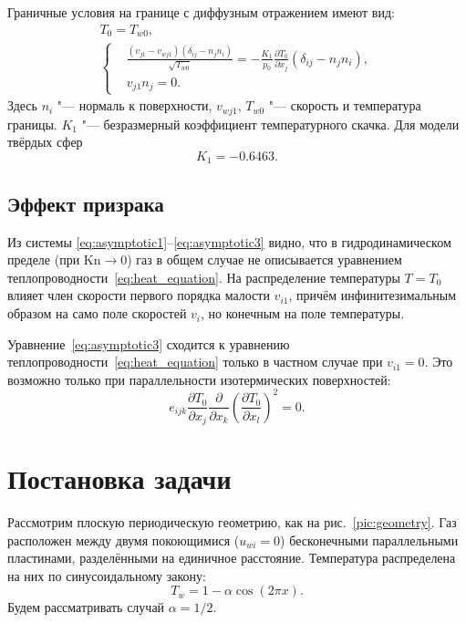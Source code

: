 \documentclass[english,russian,a4paper,12pt]{article}
\newcommand{\Kn}{\mathrm{Kn}}
\newcommand{\pder}[2][]{\frac{\partial#1}{\partial#2}}
\begin{document}
Граничные условия на границе с диффузным отражением имеют вид:
\begin{gather}
	T_0 = T_{w0}, \label{eq:bound:T} \\
	\left\{
	\begin{aligned}
		& \frac{(v_{j1}-v_{wj1})(\delta_{ij}-n_jn_i)}{\sqrt{T_{w0}}} = 
			-\frac{K_1}{p_0}\pder[T_0]{x_j}(\delta_{ij}-n_jn_i), \\
		& v_{j1}n_j = 0.
	\end{aligned}
	\right. \label{eq:bound:v}
\end{gather}
Здесь \(n_i\) "--- нормаль к поверхности, \(v_{wj1}\), \(T_{w0}\) "--- скорость и температура границы.
\(K_1\) "--- безразмерный коэффициент температурного скачка. Для модели твёрдых сфер 
\[ K_1 = -0.6463. \]

\subsection{Эффект призрака}

Из системы \eqref{eq:asymptotic1}--\eqref{eq:asymptotic3} видно, что в гидродинамическом пределе (при \(\Kn\to0\))
газ в общем случае не описывается уравнением теплопроводности~\eqref{eq:heat_equation}.
На распределение температуры \(T=T_0\) влияет член скорости первого порядка малости \(v_{i1}\),
причём инфинитезимальным образом на само поле скоростей \(v_i\),
но конечным на поле температуры.

Уравнение~\eqref{eq:asymptotic3} сходится к уравнению теплопроводности~\eqref{eq:heat_equation}
только в частном случае при \(v_{i1} = 0\).
Это возможно только при параллельности изотермических поверхностей:
\begin{equation}
	e_{ijk}\pder[T_0]{x_j}\pder{x_k}\left(\pder[T_0]{x_l}\right)^2 = 0.
\end{equation}

\section{Постановка задачи}

Рассмотрим плоскую периодическую геометрию, как на рис.~\ref{pic:geometry}.
Газ расположен между двумя покоющимися (\(u_{wi} = 0\)) бесконечными параллельными пластинами,
разделёнными на единичное расстояние. Температура распределена на них по синусоидальному закону:
\begin{equation}
	T_w = 1-\alpha\cos(2\pi x).
\end{equation}
Будем рассматривать случай \(\alpha=1/2\).
\end{document}

